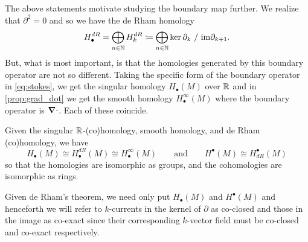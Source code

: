 \documentclass[conf]{new-aiaa}
\begin{document}
The above statements motivate studying the boundary map further. We realize that $\partial^2=0$ and so we have the de Rham homology
\begin{equation}
H_\bullet^{dR} = \bigoplus_{n\in \mathbb{N}} H_k^{dR} \coloneqq \bigoplus_{n\in \mathbb{N}} \ker \partial_k ~/~ \mathrm{im} \partial_{k+1}. 
\end{equation}
But, what is most important, is that the homologies generated by this boundary operator are not so different. Taking the specific form of the boundary operator in \cref{eq:stokes}, we get the singular homology $H_\bullet(M)$ over $\mathbb{R}$ and in \cref{prop:grad_dot} we get the smooth homology $H^\infty_\bullet(M)$ where the boundary operator is $\boldsymbol{\nabla} \cdot$. Each of these coincide.
\begin{theorem}
    Given the singular $\mathbb{R}$-(co)homology, smooth homology, and de Rham (co)homology, we have 
\begin{equation}
    H_\bullet(M)\cong H_\bullet^{dR}(M) \cong H_\bullet^\infty(M) \qquad \textrm{and} \qquad H^\bullet(M) \cong H^\bullet_{dR}(M)
\end{equation}
so that the homologies are isomorphic as groups, and the cohomologies are isomorphic as rings.
\end{theorem}
Given de Rham's theorem, we need only put $H_\bullet(M)$ and $H^\bullet(M)$ and henceforth we will refer to $k$-currents in the kernel of $\partial$ as co-closed and those in the image as co-exact since their corresponding $k$-vector field must be co-closed and co-exact respectively.
\end{document}
